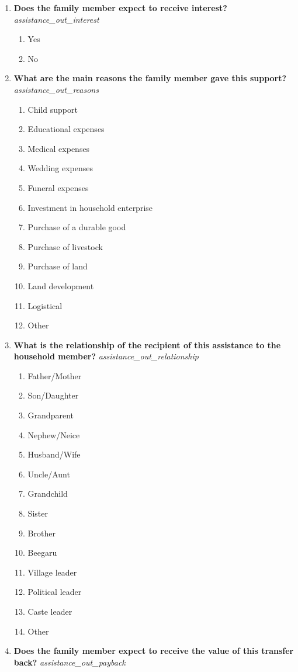 \documentclass{article}
\begin{document}
\begin{enumerate}
\begin{enumerate}[label*=\arabic*.]
\item {\bfseries Does the family member expect to receive interest?}\emph{ assistance\_out\_interest }
\begin{enumerate}
\item Yes
\item No
\end{enumerate}
\item {\bfseries What are the main reasons the family member gave this support?}\emph{ assistance\_out\_reasons }
\begin{enumerate}
\item Child support
\item Educational expenses
\item Medical expenses
\item Wedding expenses
\item Funeral expenses
\item Investment in household enterprise
\item Purchase of a durable good
\item Purchase of livestock
\item Purchase of land
\item Land development
\item Logistical
\item Other
\end{enumerate}
\item {\bfseries What is the relationship of the recipient of this assistance to the household member?}\emph{ assistance\_out\_relationship }
\begin{enumerate}
\item Father/Mother
\item Son/Daughter
\item Grandparent
\item Nephew/Neice
\item Husband/Wife
\item Uncle/Aunt
\item Grandchild
\item Sister
\item Brother
\item Beegaru
\item Village leader
\item Political leader
\item Caste leader
\item Other
\end{enumerate}
\item {\bfseries Does the family member expect to receive the value of this transfer back?}\emph{ assistance\_out\_payback }

\end{enumerate}
\end{enumerate}
\end{document}
